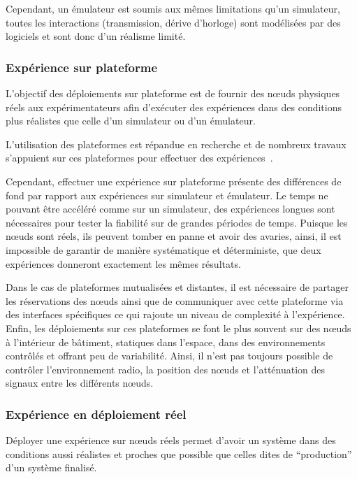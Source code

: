 Cependant, un émulateur est soumis aux mêmes limitations qu'un simulateur, toutes les interactions (transmission, dérive d'horloge) sont modélisées par des logiciels et sont donc d'un réalisme limité.

\subsubsection{Expérience sur plateforme}
\label{makesense:testbeds}

L'objectif des déploiements sur plateforme est de fournir des nœuds physiques réels aux expérimentateurs afin d'exécuter des expériences dans des conditions plus réalistes que celle d'un simulateur ou d'un émulateur.

L'utilisation des plateformes est répandue en recherche et de nombreux travaux s'appuient sur ces plateformes pour effectuer des expériences~\cite{theoleyremesures,handziski2006twist}.

Cependant, effectuer une expérience sur plateforme présente des différences de fond par rapport aux expériences sur simulateur et émulateur.
Le temps ne pouvant être accéléré comme sur un simulateur, des expériences longues sont nécessaires pour tester la fiabilité sur de grandes périodes de temps.
Puisque les nœuds sont réels, ils peuvent tomber en panne et avoir des avaries, ainsi, il est impossible de garantir de manière systématique et déterministe, que deux expériences donneront exactement les mêmes résultats. 

Dans le cas de plateformes mutualisées et distantes, il est nécessaire de partager les réservations des nœuds ainsi que de communiquer avec cette plateforme via des interfaces spécifiques ce qui rajoute un niveau de complexité à l'expérience.
Enfin, les déploiements sur ces plateformes se font le plus souvent sur des nœuds à l'intérieur de bâtiment, statiques dans l'espace, dans des environnements contrôlés et offrant peu de variabilité.
Ainsi, il n'est pas toujours possible de contrôler l'environnement radio, la position des nœuds et l'atténuation des signaux entre les différents nœuds. 

\subsubsection{Expérience en déploiement réel}
\label{makesense:real_deployment}

Déployer une expérience sur nœuds réels permet d'avoir un système dans des conditions aussi réalistes et proches que possible que celles dites de ``production'' d'un système finalisé.

